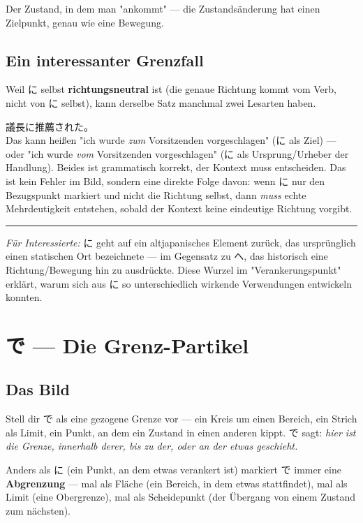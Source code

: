 \documentclass[12pt]{book}
\begin{document}
Der Zustand, in dem man "ankommt" — die Zustandsänderung hat einen Zielpunkt, genau wie eine Bewegung.

\section*{Ein interessanter Grenzfall}

Weil に selbst \textbf{richtungsneutral} ist (die genaue Richtung kommt vom Verb, nicht von に selbst), kann derselbe Satz manchmal zwei Lesarten haben.

\par\quad 議長に推薦された。\\

Das kann heißen "ich wurde \emph{zum} Vorsitzenden vorgeschlagen" (に als Ziel) — oder "ich wurde \emph{vom} Vorsitzenden vorgeschlagen" (に als Ursprung/Urheber der Handlung). Beides ist grammatisch korrekt, der Kontext muss entscheiden. Das ist kein Fehler im Bild, sondern eine direkte Folge davon: wenn に nur den Bezugspunkt markiert und nicht die Richtung selbst, dann \emph{muss} echte Mehrdeutigkeit entstehen, sobald der Kontext keine eindeutige Richtung vorgibt.

\bigskip\hrule\bigskip

\emph{Für Interessierte:} に geht auf ein altjapanisches Element zurück, das ursprünglich einen statischen Ort bezeichnete — im Gegensatz zu へ, das historisch eine Richtung/Bewegung hin zu ausdrückte. Diese Wurzel im "Verankerungspunkt" erklärt, warum sich aus に so unterschiedlich wirkende Verwendungen entwickeln konnten.



\chapter{で — Die Grenz-Partikel}

\section*{Das Bild}

Stell dir で als eine gezogene Grenze vor — ein Kreis um einen Bereich, ein Strich als Limit, ein Punkt, an dem ein Zustand in einen anderen kippt. で sagt: \emph{hier ist die Grenze, innerhalb derer, bis zu der, oder an der etwas geschieht.}

Anders als に (ein Punkt, an dem etwas verankert ist) markiert で immer eine \textbf{Abgrenzung} — mal als Fläche (ein Bereich, in dem etwas stattfindet), mal als Limit (eine Obergrenze), mal als Scheidepunkt (der Übergang von einem Zustand zum nächsten).
\end{document}
